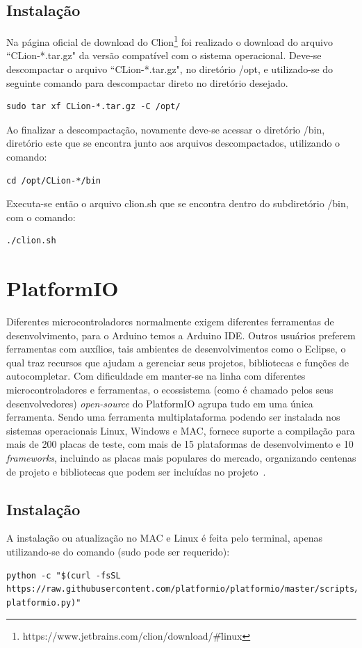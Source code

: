\documentclass[a4paper,12pt,portuguese]{ufms-cpcx}
\begin{document}
\subsection{Instalação}
Na página oficial de download do Clion\footnote{https://www.jetbrains.com/clion/download/\#\=linux} foi realizado o download do arquivo ``CLion-*.tar.gz" da versão compatível com o sistema operacional. Deve-se descompactar o arquivo ``CLion-*.tar.gz", no diretório /opt, e utilizado-se do seguinte comando para descompactar direto no diretório desejado.
\begin{lstlisting}
sudo tar xf CLion-*.tar.gz -C /opt/
\end{lstlisting}
Ao finalizar a descompactação, novamente deve-se acessar o diretório /bin, diretório este que se encontra junto aos arquivos descompactados, utilizando o comando: 
\begin{lstlisting}
cd /opt/CLion-*/bin
\end{lstlisting}
Executa-se então o arquivo clion.sh que se encontra dentro do subdiretório /bin, com o comando:
\begin{lstlisting}
./clion.sh
\end{lstlisting}

\section{PlatformIO}
Diferentes microcontroladores normalmente exigem diferentes ferramentas de desenvolvimento, para o Arduino temos a Arduino IDE. Outros usuários preferem ferramentas com auxílios, tais ambientes de desenvolvimentos como o Eclipse, o qual traz recursos que ajudam a gerenciar seus projetos, bibliotecas e funções de autocompletar. Com dificuldade em manter-se na linha com diferentes microcontroladores e ferramentas, o ecossistema (como é chamado pelos seus desenvolvedores) \textit{open-source} do PlatformIO agrupa tudo em uma única ferramenta. Sendo uma ferramenta multiplataforma podendo ser instalada nos sistemas operacionais Linux, Windows e MAC, fornece suporte a compilação para mais de 200 placas de teste, com mais de 15 plataformas de desenvolvimento e 10 \textit{frameworks}, incluindo as placas mais populares do mercado, organizando centenas de projeto e bibliotecas que podem ser incluídas no projeto~\cite{platiformio}.

\subsection{Instalação}
A instalação ou atualização no MAC e Linux é feita pelo terminal, apenas utilizando-se do comando (sudo pode ser requerido): 
\begin{lstlisting}
python -c "$(curl -fsSL https://raw.githubusercontent.com/platformio/platformio/master/scripts/get-platformio.py)"
\end{lstlisting}
\end{document}
